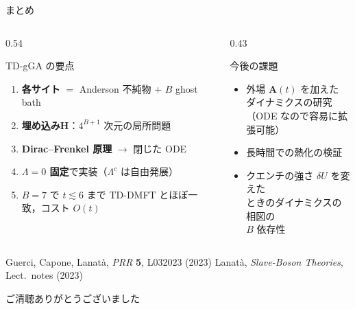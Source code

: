 \documentclass[12pt,aspectratio=169]{beamer}
\begin{document}
\begin{frame}[shrink=3]{まとめ}
  \begin{columns}[T]
    \begin{column}{0.54\textwidth}
      \begin{block}{TD-gGA の要点}
        \medskip
        \begin{enumerate}\itemsep4pt
          \item \textbf{各サイト} $=$ Anderson 不純物 $+$ $B$ ghost bath
          \item \textbf{埋め込みH}：$4^{B+1}$ 次元の局所問題
          \item \textbf{Dirac--Frenkel 原理} $\to$ 閉じた ODE
          \item \textbf{$\Lambda=0$ 固定}で実装（$\Lambda^c$ は自由発展）
          \item $B=7$ で $t\lesssim6$ まで TD-DMFT とほぼ一致，コスト $O(t)$
        \end{enumerate}
        \medskip
      \end{block}
    \end{column}

    \begin{column}{0.43\textwidth}
      \begin{block}{今後の課題}
        \medskip
        \begin{itemize}\itemsep4pt
          \item 外場 $\mathbf{A}(t)$ を加えた\\
            ダイナミクスの研究\\
            {\footnotesize（ODE なので容易に拡張可能）}
          \item 長時間での熱化の検証
          \item クエンチの強さ $\delta U$ を変えた\\
            ときのダイナミクスの相図の\\
            $B$ 依存性
        \end{itemize}
        \medskip
      \end{block}
    \end{column}
  \end{columns}

  \smallskip
  {\footnotesize
    Guerci, Capone, Lanat\`{a}, \textit{PRR} \textbf{5}, L032023 (2023)\quad
    Lanat\`{a}, \textit{Slave-Boson Theories}, Lect.\ notes (2023)
  }

  \medskip
  \centering\large ご清聴ありがとうございました

\end{frame}
\end{document}
